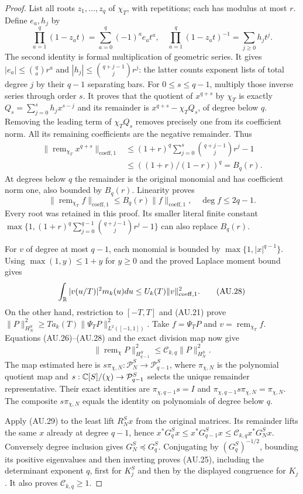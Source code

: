 \begin{proof}
List all roots $z_1,\ldots,z_q$ of $\chi_T$, with repetitions;
each has modulus at most $r$. Define $e_a,h_j$ by
\[
 \prod_{a=1}^q(1-z_at)=\sum_{a=0}^q(-1)^ae_at^a,
 \quad
 \prod_{a=1}^q(1-z_at)^{-1}=\sum_{j\ge0}h_jt^j.
\]
The second identity is formal multiplication of geometric series.
It gives $|e_a|\le\binom qa r^a$ and
$|h_j|\le\binom{q+j-1}{j}r^j$: the latter counts exponent lists
of total degree $j$ by their $q-1$ separating bars.
For $0\le s\le q-1$, multiply those inverse series through order $s$.
It proves that the quotient of $x^{q+s}$ by $\chi_T$ is exactly
$Q_s=\sum_{j=0}^sh_jx^{s-j}$ and its remainder is
$x^{q+s}-\chi_TQ_s$, of degree below $q$.
Removing the leading term of $\chi_TQ_s$ removes precisely one
from its coefficient norm. All its remaining coefficients are the
negative remainder. Thus
\[
 \begin{split}
 \|\operatorname{rem}_{\chi_T}x^{q+s}\|_{\mathrm{coeff},1}
 &\le(1+r)^q\sum_{j=0}^s\binom{q+j-1}{j}r^j-1\\
 &\le((1+r)/(1-r))^q=B_q(r).
 \end{split}
\]
At degrees below $q$ the remainder is the original monomial and has
coefficient norm one, also bounded by $B_q(r)$. Linearity proves
\[
 \|\operatorname{rem}_{\chi_T}f\|_{\mathrm{coeff},1}
 \le B_q(r)\|f\|_{\mathrm{coeff},1},\quad\deg f\le2q-1.
 \tag{AU.27}
\]
Every root was retained in this proof. Its smaller literal finite
constant $\max\{1,(1+r)^q\sum_{j=0}^{q-1}\binom{q+j-1}{j}r^j-1\}$
can also replace $B_q(r)$.

For $v$ of degree at most $q-1$, each monomial is bounded by
$\max\{1,|x|^{q-1}\}$. Using $\max(1,y)\le1+y$ for $y\ge0$
and the proved Laplace moment bound gives
\[
 \int_\mathbb R|v(u/T)|^2m_k(u)du
             \le U_k(T)\|v\|_{\mathrm{coeff},1}^2.        \tag{AU.28}
\]
On the other hand, restriction to $[-T,T]$ and (AU.21) prove
$\|P\|_{H_N^S}^2\ge T a_k(T)\|\Psi_TP\|_{L^2([-1,1])}^2$.
Take $f=\Psi_TP$ and $v=\operatorname{rem}_{\chi_T}f$.
Equations (AU.26)--(AU.28) and the exact division map now give
\[
 \|\operatorname{rem}_\chi P\|_{H_{q-1}^S}^2
                      \le\mathcal C_{k,q}\|P\|_{H_N^S}^2.
 \tag{AU.29}
\]
The map estimated here is $s\pi_{\chi,N}:\mathcal P_N^S\to
\mathcal P_{q-1}^S$, where $\pi_{\chi,N}$ is the polynomial quotient
map and $s:\mathbb C[S]/(\chi)\to\mathcal P_{q-1}^S$ selects the unique
remainder representative. Their exact identities are
$\pi_{\chi,q-1}s=I$ and
$\pi_{\chi,q-1}s\pi_{\chi,N}=\pi_{\chi,N}$.
The composite $s\pi_{\chi,N}$ equals the identity on polynomials
of degree below $q$.

Apply (AU.29) to the least lift $R_N^Sx$ from the original matrices.
Its remainder lifts the same
$x$ already at degree $q-1$, hence
$x^*G_q^Sx\le x^*G_{q-1}^Sx
\le\mathcal C_{k,q}x^*G_N^Sx$. Conversely degree inclusion gives
$G_N^S\preceq G_q^S$. Conjugating by $(G_q^S)^{-1/2}$, bounding its positive
eigenvalues and then inverting proves (AU.25), including the
determinant exponent $q$, first for $K_j^S$ and then by the displayed
congruence for $K_j$. It also proves $\mathcal C_{k,q}\ge1$.
\end{proof}

